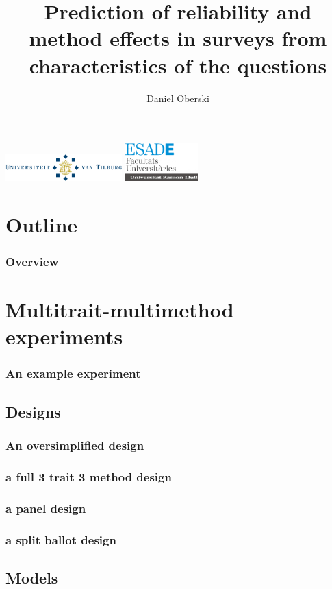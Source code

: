 \documentclass{beamer}
\title{Prediction of reliability and method effects in surveys from characteristics of the questions}
\author{Daniel Oberski}
\institute
{
  \inst{}%
  Faculty of Social and Behavioural Sciences\\
  Tilburg University
  \and
  \inst{}%
  Survey Research Centre of Catalunya\\
  ESADE, Barcelona\\
  Universitat Ramon Llull\vspace{-1.2cm}
}
\date{}
\begin{document}
\begin{frame}
	\titlepage
	\begin{center}
	 \includegraphics[width=4.5cm]{i/uvttransparent.png}\hspace{.2cm}
	 \includegraphics[width=2.8cm]{i/esade.png}	
  \end{center}	
\end{frame}

\section*{Outline}

\begin{frame}
\frametitle{Overview}
	\tableofcontents
\end{frame}

\section{Multitrait-multimethod experiments}

\begin{frame}
	\frametitle{An example experiment}
\end{frame}

\subsection{Designs}

\begin{frame}	
	\frametitle{An oversimplified design}
\end{frame}	
\begin{frame}	
	\frametitle{a full 3 trait 3 method design}
\end{frame}	
\begin{frame}	
	\frametitle{a panel design}
\end{frame}	
\begin{frame}	
	\frametitle{a split ballot design}
\end{frame}	

\subsection{Models}
\end{document}
